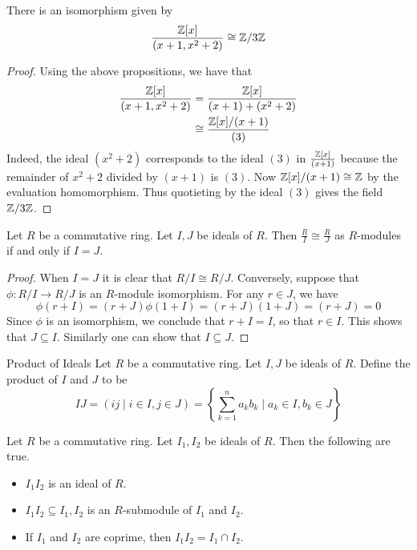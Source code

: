 \documentclass[a4paper]{article}
\begin{document}
\begin{eg}{}{} There is an isomorphism given by $$\frac{\mathbb{Z}[x]}{(x+1,x^2+2)}\cong\mathbb{Z}/3\mathbb{Z}$$ \tcbline
\begin{proof}
Using the above propositions, we have that 
\begin{align*}
\frac{\mathbb{Z}[x]}{(x+1,x^2+2)}&=\frac{\mathbb{Z}[x]}{(x+1)+(x^2+2)}\\
&\cong\frac{\mathbb{Z}[x]/(x+1)}{(3)}
\end{align*}
Indeed, the ideal $(x^2+2)$ corresponds to the ideal $(3)$ in $\frac{\mathbb{Z}[x]}{(x+1)}$ because the remainder of $x^2+2$ divided by $(x+1)$ is $(3)$. Now $\mathbb{Z}[x]/(x+1)\cong\mathbb{Z}$ by the evaluation homomorphism. Thus quotieting by the ideal $(3)$ gives the field $\mathbb{Z}/3\mathbb{Z}$. 
\end{proof}
\end{eg}

\begin{prp}{}{} Let $R$ be a commutative ring. Let $I,J$ be ideals of $R$. Then $\frac{R}{I}\cong\frac{R}{J}$ as $R$-modules if and only if $I=J$. \tcbline
\begin{proof}
When $I=J$ it is clear that $R/I\cong R/J$. Conversely, suppose that $\phi:R/I\to R/J$ is an $R$-module isomorphism. For any $r\in J$, we have $$\phi(r+I)=(r+J)\phi(1+I)=(r+J)(1+J)=(r+J)=0$$ Since $\phi$ is an isomorphism, we conclude that $r+I=I$, so that $r\in I$. This shows that $J\subseteq I$. Similarly one can show that $I\subseteq J$. 
\end{proof}
\end{prp}

\begin{defn}{Product of Ideals}{} Let $R$ be a commutative ring. Let $I,J$ be ideals of $R$. Define the product of $I$ and $J$ to be $$IJ=(ij\;|\;i\in I, j\in J)=\left\{\sum_{k=1}^na_kb_k\;|\;a_k\in I,b_k\in J\right\}$$
\end{defn}

\begin{lmm}{}{} Let $R$ be a commutative ring. Let $I_1,I_2$ be ideals of $R$. Then the following are true. 
\begin{itemize}
\item $I_1I_2$ is an ideal of $R$. 
\item $I_1I_2\subseteq I_1,I_2$ is an $R$-submodule of $I_1$ and $I_2$. 
\item If $I_1$ and $I_2$ are coprime, then $I_1I_2=I_1\cap I_2$. 
\end{itemize}
\end{lmm}
\end{document}
